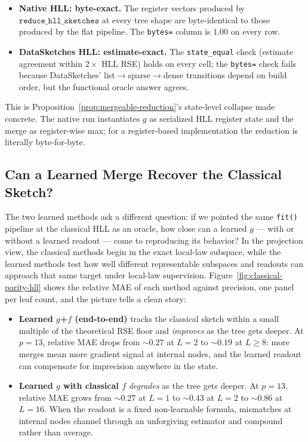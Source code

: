\begin{itemize}[leftmargin=1.5em]
    \item \textbf{Native HLL: byte-exact.} The register vectors produced
          by $\texttt{reduce\_hll\_sketches}$ at every tree shape are
          byte-identical to those produced by the flat pipeline. The
          \texttt{bytes=} column is $1.00$ on every row.
    \item \textbf{DataSketches HLL: estimate-exact.} The \texttt{state\_equal}
          check (estimate agreement within $2\times$ HLL RSE) holds on
          every cell; the \texttt{bytes=} check fails because
          DataSketches' list$\to$sparse$\to$dense transitions depend on
          build order, but the functional oracle answer agrees.
\end{itemize}

This is Proposition~\ref{prop:mergeable-reduction}'s state-level collapse
made concrete. The native run instantiates $g$ as serialized HLL register
state and the merge as register-wise max; for a register-based implementation
the reduction is literally byte-for-byte.

\subsection{Can a Learned Merge Recover the Classical Sketch?}

The two learned methods ask a different question: if we pointed the same
\texttt{fit()} pipeline at the classical HLL as an oracle, how close can
a learned $g$ --- with or without a learned readout --- come to
reproducing its behavior? In the projection view, the classical methods
begin in the exact local-law subspace, while the learned methods test how
well different representable subspaces and readouts can approach that same
target under local-law supervision. Figure~\ref{fig:classical-parity-hll} shows
the relative MAE of each method against precision, one panel per leaf
count, and the picture tells a clean story:

\begin{itemize}[leftmargin=1.5em]
    \item \textbf{Learned $g$+$f$ (end-to-end)} tracks the classical
          sketch within a small multiple of the theoretical RSE floor and
          \emph{improves} as the tree gets deeper. At $p=13$, relative
          MAE drops from $\sim\!0.27$ at $L=2$ to $\sim\!0.19$ at
          $L \ge 8$: more merges mean more gradient signal at internal
          nodes, and the learned readout can compensate for imprecision
          anywhere in the state.
    \item \textbf{Learned $g$ with classical $f$} \emph{degrades} as the
          tree gets deeper. At $p=13$, relative MAE grows from $\sim\!0.27$
          at $L=1$ to $\sim\!0.43$ at $L=2$ to $\sim\!0.86$ at $L=16$.
          When the readout is a fixed non-learnable formula, mismatches
          at internal nodes channel through an unforgiving estimator and
          compound rather than average.
\end{itemize}

